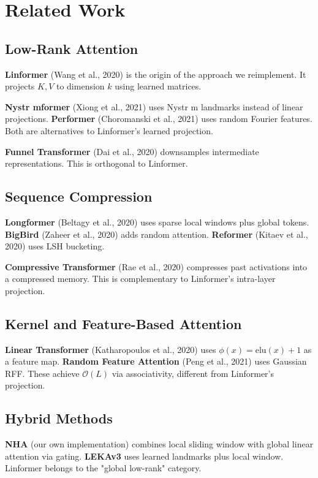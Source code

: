 \section{Related Work}

\subsection{Low-Rank Attention}

\textbf{Linformer} (Wang et al., 2020) is the origin of the approach we 
reimplement. It projects $K, V$ to dimension $k$ using learned matrices.

\textbf{Nystr mformer} (Xiong et al., 2021) uses Nystr m landmarks instead of 
linear projections. \textbf{Performer} (Choromanski et al., 2021) uses random 
Fourier features. Both are alternatives to Linformer's learned projection.

\textbf{Funnel Transformer} (Dai et al., 2020) downsamples intermediate 
representations. This is orthogonal to Linformer.

\subsection{Sequence Compression}

\textbf{Longformer} (Beltagy et al., 2020) uses sparse local windows plus global 
tokens. \textbf{BigBird} (Zaheer et al., 2020) adds random attention. 
\textbf{Reformer} (Kitaev et al., 2020) uses LSH bucketing.

\textbf{Compressive Transformer} (Rae et al., 2020) compresses past activations 
into a compressed memory. This is complementary to Linformer's intra-layer 
projection.

\subsection{Kernel and Feature-Based Attention}

\textbf{Linear Transformer} (Katharopoulos et al., 2020) uses $\phi(x) = \text{elu}(x)+1$ 
as a feature map. \textbf{Random Feature Attention} (Peng et al., 2021) uses 
Gaussian RFF. These achieve $\mathcal{O}(L)$ via associativity, different 
from Linformer's projection.

\subsection{Hybrid Methods}

\textbf{NHA} (our own implementation) combines local sliding window with global 
linear attention via gating. \textbf{LEKAv3} uses learned landmarks plus local 
window. Linformer belongs to the "global low-rank" category.


